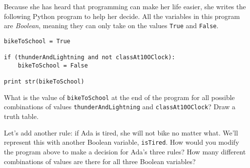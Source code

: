 \documentclass{article}
\begin{document}
Because she has heard that programming can make her life easier,
she writes the following Python program to help her decide. All
the variables in this program are \emph{Boolean}, meaning they can
only take on the values \texttt{True} and \texttt{False}.

\begin{lstlisting}
bikeToSchool = True

if (thunderAndLightning and not classAt10OClock):
	bikeToSchool = False
	
print str(bikeToSchool)
\end{lstlisting}

What is the value of \texttt{bikeToSchool} at the end of the
program for all
possible combinations of values \texttt{thunderAndLightning} and
\texttt{classAt10OClock}? Draw a truth table.

Let's add another rule: if Ada is tired, she will not bike no
matter what. We'll represent this with another Boolean variable,
\texttt{isTired}. How would you modify the program above to
make a decision for Ada's three rules? How many different combinations
of values are there for all three Boolean variables?
\end{document}
